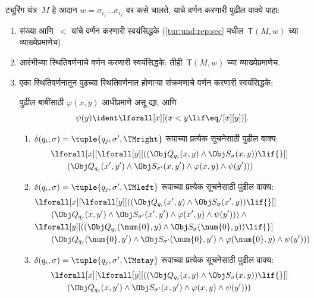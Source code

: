 ट्यूरिंग यंत्र~$M$ हे
आदान $w = \sigma_{i_1}\dots\sigma_{i_k}$
वर कसे चालते, याचे
वर्णन करणारी पुढील
वाक्ये पाहा:
\begin{enumerate}
\item संख्या आणि~$<$
यांचे वर्णन करणारी
स्वयंसिद्धके (\ref{tur:und:rep:sec}
मधील~$\mathsf{T}(M,w)$ च्या
व्याख्येप्रमाणेच).
\item आरंभीच्या स्थितिवर्णनाचे
वर्णन करणारी स्वयंसिद्धके:
तीही~$\mathsf{T}(M,w)$
च्या व्याख्येप्रमाणेच.
\item एका स्थितिवर्णनातून
पुढच्या स्थितिवर्णनात
होणाऱ्या संक्रमणाचे
वर्णन करणारी स्वयंसिद्धके:

पुढील बाबींसाठी $\varphi(x, y)$
आधीप्रमाणे असू द्या,
आणि
\[  \psi(y) \ident \lforall[x][(x < y \lif \eq/[x][y])].
\]
\begin{enumerate}
\item \label{tur:und:tra:rep-right}
$\delta(q_i, \sigma) =
  \tuple{q_j, \sigma', \TMright}$
रूपाच्या प्रत्येक सूचनेसाठी
पुढील वाक्य:
\begin{align*}
& \lforall[x][\lforall[y][(
   (\Obj Q_{q_i}(x, y) \land \Obj S_{\sigma}(x, y)) \lif {}]] \\
&\qquad   (\Obj Q_{q_j}(x', y') \land \Obj S_{\sigma'}(x, y') \land
\varphi(x, y) \land \psi(y')))
\end{align*}
\item \label{tur:und:tra:rep-left}
$\delta(q_i, \sigma) =
  \tuple{q_j, \sigma', \TMleft}$
रूपाच्या प्रत्येक सूचनेसाठी
पुढील वाक्य:
\begin{align*}
& \lforall[x][\lforall[y][
    ((\Obj Q_{q_i}(x', y) \land \Obj S_{\sigma}(x', y)) \lif {}]]\\
& \qquad   (\Obj Q_{q_j}(x, y') \land \Obj S_{\sigma'}(x', y') \land
\varphi(x', y) \land \psi(y'))) \land {}\\
& \lforall[y][((\Obj Q_{q_i}(\num{0}, y) \land \Obj S_{\sigma}(\num{0},
    y)) \lif {}]\\
& \qquad (\Obj Q_{q_j}(\num{0}, y') \land \Obj S_{\sigma'}(\num{0},
  y') \land \varphi(\num{0}, y) \land \psi(y')))
\end{align*}
\item \label{tur:und:tra:rep-stay}
$\delta(q_i, \sigma) =
  \tuple{q_j, \sigma', \TMstay}$
रूपाच्या प्रत्येक सूचनेसाठी
पुढील वाक्य:
\begin{align*}
& \lforall[x][\lforall[y][(
   (\Obj Q_{q_i}(x, y) \land \Obj S_{\sigma}(x, y)) \lif {}]] \\
&\qquad (\Obj Q_{q_j}(x, y') \land \Obj S_{\sigma'}(x, y') \land
\varphi(x, y) \land \psi(y')))

\end{align*}
\end{enumerate}
\end{enumerate}
